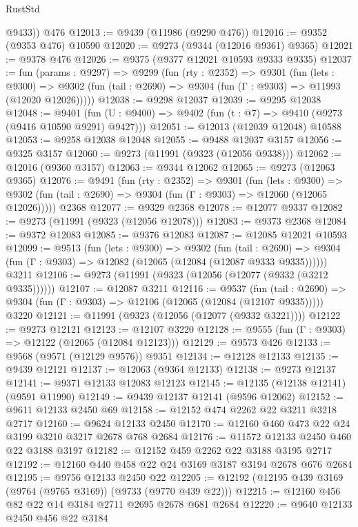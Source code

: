 \begin{lexlean}{RustStd}
\begin{coremodule}
        @9433))
    @476
@12013 := @9439 (@11986 (@9290 @476))
@12016 := @9352 (@9353 @476) @10590
@12020 := @9273 (@9344 (@12016 @9361) @9365)
@12021 := @9378 @476
@12026 := @9375 (@9377 @12021 @10593 @9333 @9335)
@12037 := fun (params : @9297) =>
  @9299
    (fun (rty : @2352) =>
    @9301
      (fun (lets : @9300) =>
      @9302 (fun (tail : @2690) => @9304 (fun (Γ : @9303) => @11993 (@12020 @12026)))))
@12038 := @9298 @12037
@12039 := @9295 @12038
@12048 := @9401
    (fun (U : @9400) => @9402 (fun (t : @7) => @9410 (@9273 (@9416 @10590 @9291) @9427)))
@12051 := @12013 (@12039 @12048) @10588
@12053 := @9258 @12038 @12048
@12055 := @9488 @12037 @3157
@12056 := @9325 @3157
@12060 := @9273 (@11991 (@9323 (@12056 @9338)))
@12062 := @12016 (@9360 @3157)
@12063 := @9344 @12062
@12065 := @9273 (@12063 @9365)
@12076 := @9491
    (fun (rty : @2352) =>
    @9301
      (fun (lets : @9300) =>
      @9302 (fun (tail : @2690) => @9304 (fun (Γ : @9303) => @12060 (@12065 @12026)))))
    @2368
@12077 := @9329 @2368
@12078 := @12077 @9337
@12082 := @9273 (@11991 (@9323 (@12056 @12078)))
@12083 := @9373 @2368
@12084 := @9372 @12083
@12085 := @9376 @12083
@12087 := @12085 @12021 @10593
@12099 := @9513
    (fun (lets : @9300) =>
    @9302
      (fun (tail : @2690) =>
      @9304 (fun (Γ : @9303) => @12082 (@12065 (@12084 (@12087 @9333 @9335))))))
    @3211
@12106 := @9273 (@11991 (@9323 (@12056 (@12077 (@9332 (@3212 @9335))))))
@12107 := @12087 @3211
@12116 := @9537
    (fun (tail : @2690) => @9304 (fun (Γ : @9303) => @12106 (@12065 (@12084 (@12107 @9335)))))
    @3220
@12121 := @11991 (@9323 (@12056 (@12077 (@9332 @3221))))
@12122 := @9273 @12121
@12123 := @12107 @3220
@12128 := @9555 (fun (Γ : @9303) => @12122 (@12065 (@12084 @12123)))
@12129 := @9573 @426
@12133 := @9568 (@9571 (@12129 @9576)) @9351
@12134 := @12128 @12133
@12135 := @9439 @12121
@12137 := @12063 (@9364 @12133)
@12138 := @9273 @12137
@12141 := @9371 @12133 @12083 @12123
@12145 := @12135 (@12138 @12141) (@9591 @11990)
@12149 := @9439 @12137 @12141 (@9596 @12062)
@12152 := @9611 @12133 @2450 @69
@12158 := @12152 @474 @2262 @22 @3211 @3218 @2717
@12160 := @9624 @12133 @2450
@12170 := @12160 @460 @473 @22 @24 @3199 @3210 @3217 @2678 @768 @2684
@12176 := @11572 @12133 @2450 @460 @22 @3188 @3197
@12182 := @12152 @459 @2262 @22 @3188 @3195 @2717
@12192 := @12160 @440 @458 @22 @24 @3169 @3187 @3194 @2678 @676 @2684
@12195 := @9756 @12133 @2450 @22
@12205 := @12192 (@12195 @439 @3169 (@9764 (@9765 @3169)) (@9733 (@9770 @439 @22)))
@12215 := @12160 @456 @82 @22 @14 @3184 @2711 @2695 @2678 @681 @2684
@12220 := @9640 @12133 @2450 @456 @22 @3184

\end{coremodule}
\end{lexlean}
